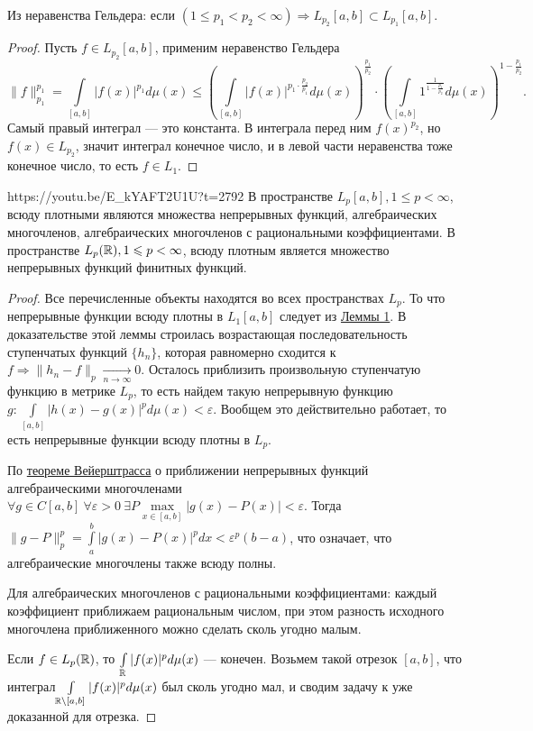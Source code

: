 \begin{corollary}
	Из неравенства Гельдера: если $(1\leqslant p_1<p_2<\infty)\Rightarrow L_{p_2}[a,b]\subset L_{p_1}[a,b]$.
\end{corollary}
\begin{proof}
	Пусть $f\in L_{p_2}[a,b]$, применим неравенство Гельдера 
	$$\|f\|^{p_1}_{p_1}=\int\limits_{[a,b]} |f(x)|^{p_1}d\mu(x)\leqslant\left(\int\limits_{[a,b]}|f(x)|^{p_1\cdot\frac{p_2}{p_1}}d\mu(x)\right)^{\frac{p_1}{p_2}}\cdot
	\left(\int\limits_{[a,b]}1^{\frac{1}{1-\frac{p_1}{p_2}}}d\mu(x)\right)^{1-\frac{p_1}{p_2}}.$$
	Самый правый интеграл --- это константа. В интеграла перед ним $f(x)^{p_2}$, но $f(x)\in L_{p_2}$, значит интеграл конечное число, и в левой части неравенства тоже конечное число, то есть $f\in L_1$.
\end{proof}

\begin{linkthm}{https://youtu.be/E_kYAFT2U1U?t=2792}
	В пространстве $L_p[a,b], 1\leqslant p<\infty$, всюду плотными являются множества непрерывных функций, алгебраических многочленов, алгебраических многочленов с рациональными коэффициентами. В пространстве $L_p(\mathbb{R}), 1\leqslant p<\infty$, всюду плотным является множество непрерывных функций финитных функций.
\end{linkthm}

\begin{proof}
	Все перечисленные объекты находятся во всех пространствах $L_p$. То что непрерывные функции всюду плотны в $L_1[a,b]$ следует из \hyperref[lemma_12.1.1]{Леммы 1}. В доказательстве этой леммы строилась возрастающая последовательность ступенчатых функций $\{h_n\}$, которая равномерно сходится к $f\Rightarrow \|h_n-f\|_p\underset{n\to\infty}{\to}0$. Осталось приблизить произвольную ступенчатую функцию в метрике $L_p$, то есть найдем такую непрерывную функцию $g: \int\limits_{[a,b]}|h(x)-g(x)|^pd\mu(x)<\varepsilon$. Вообщем это действительно работает, то есть непрерывные функции всюду плотны в $L_p$.
	
	По \hyperref[11.4.2]{теореме Вейерштрасса} о приближении непрерывных функций алгебраическими многочленами $\forall g\in C[a,b]\ \forall\varepsilon>0\ \exists P \max\limits_{x\in[a,b]} |g(x)-P(x)|<\varepsilon$. Тогда $\|g-P\|^p_p=\int\limits_{a}^b |g(x)-P(x)|^pdx<\varepsilon^p(b-a)$, что означает, что алгебраические многочлены также всюду полны.
	
	Для алгебраических многочленов с рациональными коэффициентами: каждый коэффициент приближаем рациональным числом, при этом разность исходного многочлена приближенного можно сделать сколь угодно малым.
	
	Если $f\in L_p(\mathbb{R})$, то $ \int\limits_{\mathbb{R}}|f(x)|^pd\mu(x)$ --- конечен. Возьмем такой отрезок $[a,b]$, что интеграл$ \int\limits_{\mathbb{R}\backslash[a,b]}|f(x)|^pd\mu(x)$ был сколь угодно мал, и сводим задачу к уже доказанной для отрезка.
 \end{proof}

